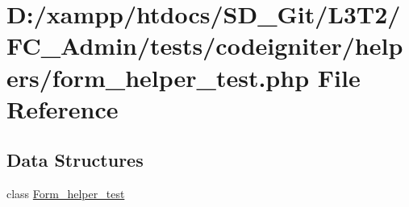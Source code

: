 \hypertarget{form__helper__test_8php}{}\section{D\+:/xampp/htdocs/\+S\+D\+\_\+\+Git/\+L3\+T2/\+F\+C\+\_\+\+Admin/tests/codeigniter/helpers/form\+\_\+helper\+\_\+test.php File Reference}
\label{form__helper__test_8php}
\subsection*{Data Structures}
\begin{DoxyCompactItemize}
\item 
class \hyperlink{class_form__helper__test}{Form\+\_\+helper\+\_\+test}
\end{DoxyCompactItemize}
